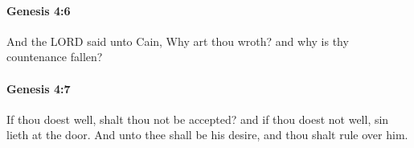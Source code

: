 		\paragraph{Genesis 4:6} %
			\label{GENESIS-4-6}

			And the LORD said unto Cain, Why art thou wroth? and why is thy countenance fallen?


		\paragraph{Genesis 4:7} %
			\label{GENESIS-4-7}

			If thou doest well, shalt thou not be accepted? and if thou doest not well, sin lieth at the door. And unto thee shall be his desire, and thou shalt rule over him.


